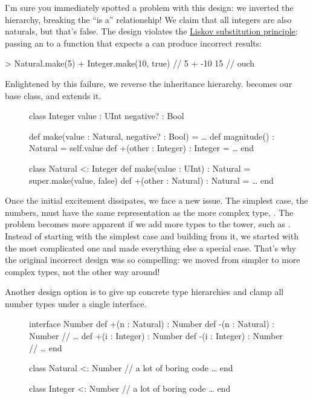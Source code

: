 \documentclass{article}
\begin{document}
I'm sure you immediately spotted a problem with this design: we inverted the hierarchy, breaking the ``is a'' relationship!
We claim that all integers are also naturals, but that's false.
The design violates the \href{https://en.wikipedia.org/wiki/Liskov_substitution_principle}{Liskov substitution principle}: passing an  to a function that expects a  can produce incorrect results:

\begin{code}
> Natural.make(5) + Integer.make(10, true) // 5 + -10
15 // ouch
\end{code}

Enlightened by this failure, we reverse the inheritance hierarchy.
 becomes our base class, and  extends it.

\begin{figure}
\begin{code}
class Integer
  value : UInt
  negative? : Bool

  def make(value : Natural, negative? : Bool) = \ldots
  def magnitude() : Natural = self.value
  def +(other : Integer) : Integer = \ldots
end

class Natural <: Integer
  def make(value : UInt) : Natural = super.make(value, false)
  def +(other : Natural) : Natural = \ldots
end
\end{code}
\end{figure}

Once the initial excitement dissipates, we face a new issue.
The simplest case, the  numbers, must have the same representation as the more complex type, .
The problem becomes more apparent if we add more types to the tower, such as .
Instead of starting with the simplest case and building from it, we started with the most complicated one and made everything else a special case.
That's why the original incorrect design was so compelling: we moved from simpler to more complex types, not the other way around!

Another design option is to give up concrete type hierarchies and clamp all number types under a single interface.

\begin{figure}
\begin{code}
interface Number
  def +(n : Natural) : Number
  def -(n : Natural) : Number
  // \ldots
  def +(i : Integer) : Number
  def -(i : Integer) : Number
  // \ldots
end

class Natural <: Number
  // a lot of boring code \ldots
end

class Integer <: Number
  // a lot of boring code \ldots
end
\end{code}
\end{figure}
\end{document}
